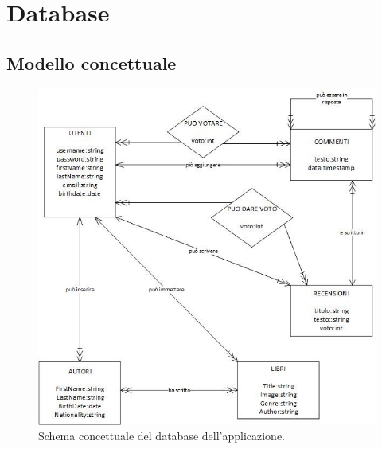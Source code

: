 \documentclass[italian]{article}
\begin{document}
\pagebreak
\section{Database}
\subsection{Modello concettuale}
\begin{figure}[h]
	\centering
	\includegraphics[width=1\linewidth]{images/schema_concettuale}
	\caption[Schema concettuale]{Schema concettuale del database dell'applicazione.}
	\label{fig:schemaconcettuale}
\end{figure}
\pagebreak
\end{document}
